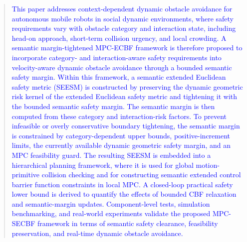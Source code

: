 \documentclass[journal]{IEEEtranTIE}
\begin{document}
    \begin{abstract}
\textcolor{blue}{This paper addresses context-dependent dynamic obstacle avoidance for autonomous mobile robots in social dynamic environments, where safety requirements vary with obstacle category and interaction state, including head-on approach, short-term collision urgency, and local crowding. A semantic margin-tightened MPC-ECBF framework is therefore proposed to incorporate category- and interaction-aware safety requirements into velocity-aware dynamic obstacle avoidance through a bounded semantic safety margin. Within this framework, a semantic extended Euclidean safety metric (SEESM) is constructed by preserving the dynamic geometric risk kernel of the extended Euclidean safety metric and tightening it with the bounded semantic safety margin. The semantic margin is then computed from these category and interaction-risk factors. To prevent infeasible or overly conservative boundary tightening, the semantic margin is constrained by category-dependent upper bounds, positive-increment limits, the currently available dynamic geometric safety margin, and an MPC feasibility guard. The resulting SEESM is embedded into a hierarchical planning framework, where it is used for global motion-primitive collision checking and for constructing semantic extended control barrier function constraints in local MPC. A closed-loop practical safety lower bound is derived to quantify the effects of bounded CBF relaxation and semantic-margin updates. Component-level tests, simulation benchmarking, and real-world experiments validate the proposed MPC-SECBF framework in terms of semantic safety clearance, feasibility preservation, and real-time dynamic obstacle avoidance.}   

    \end{abstract}
\end{document}
